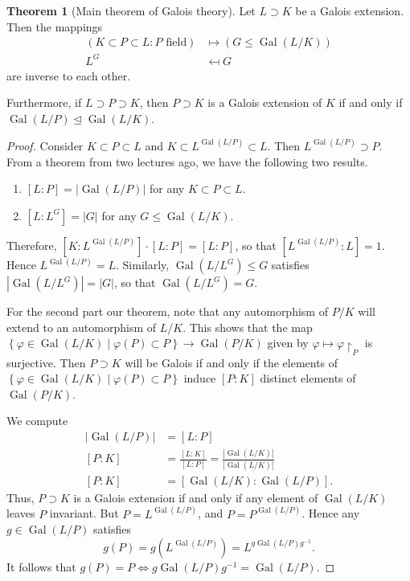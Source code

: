 \documentclass[10pt,letterpaper,cm]{nupset}
\theoremstyle{definition}
\theoremstyle{theorem}
\newtheorem{theorem}[definition]{Theorem}
\theoremstyle{remark}
\newcommand{\1}{\mathbf{1}}
\newcommand{\0}{\vec 0}
\DeclareMathOperator{\gal}{Gal}
\begin{document}
\begin{theorem}[Main theorem of Galois theory]
Let $L \supset K$ be a Galois extension. Then the mappings 
\begin{align*}
\left(K \subset P \subset L : P \text{ field}\right) &\mapsto \left(G \leq \gal(L/K)\right) 
\\ L^G &\mapsfrom G
\end{align*}
 are inverse to each other. 

Furthermore, if $L \supset P \supset K$, then $P \supset K$ is a Galois extension of $K$ if and only if $\gal(L/P) \unlhd \gal(L/K)$. 
\end{theorem}
\begin{proof}
Consider $K \subset P \subset L$ and $K \subset L^{\gal(L/P)} \subset L$. Then $L^{\gal(L/P)}\supset P$. From a theorem from two lectures ago, we have the following two results.
\begin{enumerate}[label=(\alph*)]
\item $[L:P] = \left\lvert{\gal(L/P)}\right\rvert$ for any $K \subset P \subset L$. 
\item $[L: L^G] = \left\lvert{G}\right\rvert$ for any $G \leq \gal(L/K)$. 
\end{enumerate}
Therefore, $\left[K: L^{\gal(L/P)}\right]\cdot \left[L:P\right] = \left[L:P\right]$, so that $\left[L^{\gal(L/P)} : L\right]= 1$. Hence $L^{\gal(L/P)} = L$. Similarly, $\gal(L/L^G) \leq G$ satisfies $\left\lvert{\gal(L/L^G)}\right\rvert = \left\lvert{G}\right\rvert$, so that $\gal(L/L^G) = G$. 

\medskip


For the second part  our theorem, note that any automorphism of $P/K$ will extend to an automorphism of $L/K$. This shows that the map $\left\{\varphi \in \gal(L/K) \mid \varphi(P) \subset P\right\} \to \gal(P/K)$ given by $\varphi \mapsto \varphi \restriction_P$ is surjective. Then $P \supset K$ will be Galois if and only if the elements of $\left\{\varphi \in \gal(L/K) \mid \varphi(P) \subset P\right\}$ induce $[P:K]$ distinct elements of $\gal(P/K)$. 

\medskip


We compute
\begin{align*}
\left\lvert{\gal(L/P)}\right\rvert & = [L:P]
\\ [P:K] & = \frac{[L:K]}{[L:P]} = \frac{\left\lvert{\gal(L/K)}\right\rvert}{\left\lvert{\gal(L/K)}\right\rvert}
\\ [P:K] & = \left[\gal(L/K) : \gal(L/P)\right].
\end{align*}
Thus, $P \supset K$ is a Galois extension if and only if any element of $\gal(L/K)$ leaves $P$ invariant. But $P = L^{\gal(L/P)}$, and $P = P^{\gal(L/P)}$. Hence any $g \in \gal(L/P)$ satisfies $$g(P) = g(L^{\gal(L/P)}) = L^{g\gal(L/P)g^{-1}}.$$ It follows that $g(P) = P \iff g\gal(L/P)g^{-1} = \gal(L/P)$.
\end{proof}
\end{document}
